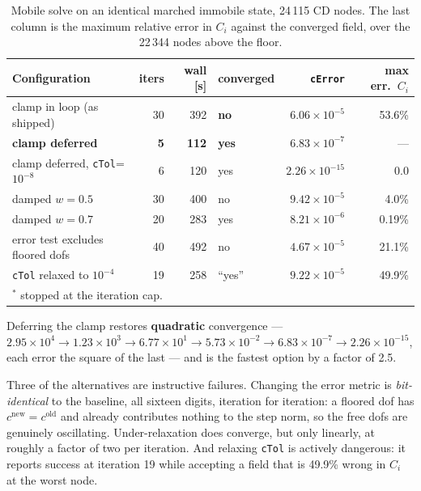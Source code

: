 \documentclass[11pt,a4paper]{article}
\newcommand{\code}[1]{\texttt{\small #1}}
\begin{document}
\begin{table}[htb]
\centering
\caption{Mobile solve on an identical marched immobile state, 24\,115 CD nodes.
The last column is the maximum relative error in $C_i$ against the converged
field, over the 22\,344 nodes above the floor.}
\label{tab:mobilefix}
\begin{tabular}{lrrlrr}
\toprule
Configuration & iters & wall [s] & converged & \code{cError} & max err.\ $C_i$ \\
\midrule
clamp in loop (as shipped)       & 30\rlap{$^\ast$} & 392 & \textbf{no}  & $6.06\times10^{-5}$ & 53.6\% \\
\textbf{clamp deferred}          & \textbf{5}       & \textbf{112} & \textbf{yes} & $6.83\times10^{-7}$ & --- \\
clamp deferred, \code{cTol}=$10^{-8}$ & 6           & 120 & yes & $2.26\times10^{-15}$ & $0.0$ \\
damped $w=0.5$                   & 30\rlap{$^\ast$} & 400 & no  & $9.42\times10^{-5}$ & 4.0\% \\
damped $w=0.7$                   & 20               & 283 & yes & $8.21\times10^{-6}$ & 0.19\% \\
error test excludes floored dofs & 40\rlap{$^\ast$} & 492 & no  & $4.67\times10^{-5}$ & 21.1\% \\
\code{cTol} relaxed to $10^{-4}$ & 19               & 258 & ``yes'' & $9.22\times10^{-5}$ & 49.9\% \\
\bottomrule
\multicolumn{6}{l}{\footnotesize $^\ast$ stopped at the iteration cap.}
\end{tabular}
\end{table}

Deferring the clamp restores \textbf{quadratic} convergence ---
$2.95\times10^{4} \to 1.23\times10^{3} \to 6.77\times10^{1} \to
5.73\times10^{-2} \to 6.83\times10^{-7} \to 2.26\times10^{-15}$, each error the
square of the last --- and is the fastest option by a factor of 2.5.

Three of the alternatives are instructive failures. Changing the error metric is
\emph{bit-identical} to the baseline, all sixteen digits, iteration for
iteration: a floored dof has $c^{\mathrm{new}}=c^{\mathrm{old}}$ and already
contributes nothing to the step norm, so the free dofs are genuinely
oscillating. Under-relaxation does converge, but only linearly, at roughly a
factor of two per iteration. And relaxing \code{cTol} is actively dangerous: it
reports success at iteration 19 while accepting a field that is 49.9\% wrong in
$C_i$ at the worst node.
\end{document}
